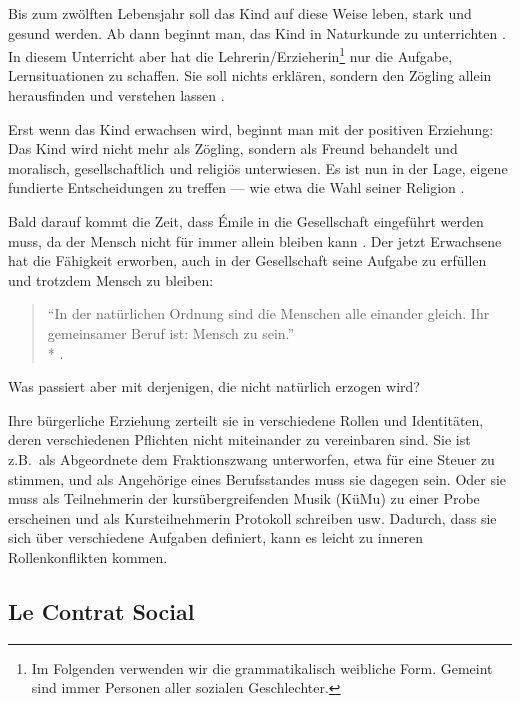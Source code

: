 Bis zum zwölften Lebensjahr soll das Kind auf diese Weise leben, stark und gesund werden.
Ab dann beginnt man, das Kind in Naturkunde zu unterrichten \parencite[55]{rousseau-1762}.
In diesem Unterricht aber hat die Lehrerin/Erzieherin\footnote{

	Im Folgenden verwenden wir die grammatikalisch weibliche Form.
	Gemeint sind immer Personen aller sozialen Geschlechter.
}
nur die Aufgabe, Lernsituationen zu schaffen.
Sie soll nichts erklären, sondern den Zögling allein herausfinden und verstehen lassen \parencite[56]{rousseau-1762}.

Erst wenn das Kind erwachsen wird, beginnt man mit der positiven Erziehung:
Das Kind wird nicht mehr als Zögling, sondern als Freund behandelt und moralisch, gesellschaftlich und religiös unterwiesen.
Es ist nun in der Lage, eigene fundierte Entscheidungen zu treffen --- wie etwa die Wahl seiner Religion \parencite[60f.]{rousseau-1762}.

Bald darauf kommt die Zeit, dass Émile in die Gesellschaft eingeführt werden muss, da der Mensch nicht für immer allein bleiben kann \parencite[61]{rousseau-1762}.
Der jetzt Erwachsene hat die Fähigkeit erworben, auch in der Gesellschaft seine Aufgabe zu erfüllen und trotzdem Mensch zu bleiben:

\begin{quote}
	``In der natürlichen Ordnung sind die Menschen alle einander gleich.
	Ihr gemeinsamer Beruf ist: Mensch zu sein.''\\*
	\parencite[50]{rousseau-1762}.
\end{quote}

Was passiert aber mit derjenigen, die nicht natürlich erzogen wird?

Ihre bürgerliche Erziehung zerteilt sie in verschiedene Rollen und Identitäten, deren verschiedenen Pflichten nicht miteinander zu vereinbaren sind.
Sie ist z.B.\ als Abgeordnete dem Fraktionszwang unterworfen, etwa für eine Steuer zu stimmen, und als Angehörige eines Berufsstandes muss sie dagegen sein.
Oder sie muss als Teilnehmerin der kursübergreifenden Musik (KüMu) zu einer Probe erscheinen und als Kursteilnehmerin Protokoll schreiben usw.
Dadurch, dass sie sich über verschiedene Aufgaben definiert, kann es leicht zu inneren Rollenkonflikten kommen.


\subsection{Le Contrat Social}

